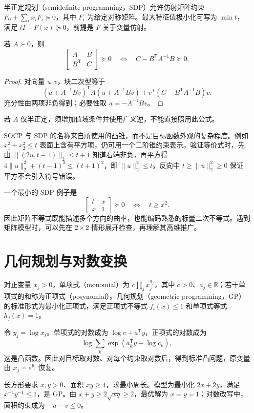 \documentclass[UTF8,12pt,a4paper,fontset=fandol]{ctexbook}
\begin{document}
半正定规划（semidefinite programming，SDP）允许仿射矩阵约束 $F_0+\sum_i x_iF_i\succeq0$，其中 $F_i$ 为给定对称矩阵。最大特征值极小化可写为 $\min t$，满足 $tI-F(x)\succeq0$，前提是 $F$ 关于变量仿射。

\begin{proposition}[Schur 补]
若 $A\succ0$，则
\[
 \begin{bmatrix}A&B\\B^{\mathsf T}&C\end{bmatrix}\succeq0
 \quad\Longleftrightarrow\quad C-B^{\mathsf T}A^{-1}B\succeq0.
\]
\end{proposition}
\begin{proof}
对向量 $u,v$，块二次型等于
\[
 (u+A^{-1}Bv)^{\mathsf T}A(u+A^{-1}Bv)
 +v^{\mathsf T}(C-B^{\mathsf T}A^{-1}B)v.
\]
充分性由两项非负得到；必要性取 $u=-A^{-1}Bv$。
\end{proof}
若 $A$ 仅半正定，须增加值域条件并使用广义逆，不能直接照用此公式。

SOCP 与 SDP 的名称来自所使用的凸锥，而不是目标函数外观的复杂程度。例如 $x_1^2+x_2^2\leq t$ 表面上含有平方项，仍可用一个二阶锥约束表示。验证等价式时，先由 $\|(2u,t-1)\|_2\leq t+1$ 知道右端非负，再平方得 $4\|u\|_2^2+(t-1)^2\leq(t+1)^2$，即 $\|u\|_2^2\leq t$。反向中 $t\geq\|u\|_2^2\geq0$ 保证平方不会引入符号错误。

一个最小的 SDP 例子是
\[
 \begin{bmatrix}t&x\\x&1\end{bmatrix}\succeq0
 \quad\Longleftrightarrow\quad t\geq x^2.
\]
因此矩阵不等式既能描述多个方向的曲率，也能编码熟悉的标量二次不等式。遇到矩阵模型时，可以先在 $2\times2$ 情形展开检查，再理解其高维推广。

\section{几何规划与对数变换}

对正变量 $x_j>0$，单项式（monomial）为 $c\prod_jx_j^{a_j}$，其中 $c>0$、$a_j\in\mathbb R$；若干单项式的和称为正项式（posynomial）。几何规划（geometric programming，GP）的标准形式为最小化正项式，满足正项式不等式 $f_i(x)\leq1$ 和单项式等式 $h_j(x)=1$。

令 $y_j=\log x_j$。单项式的对数成为 $\log c+a^{\mathsf T}y$，正项式的对数成为
\[
 \log\sum_k\exp(a_k^{\mathsf T}y+\log c_k),
\]
这是凸函数。因此对目标取对数、对每个约束取对数后，得到标准凸问题，原变量由 $x_j=e^{y_j}$ 恢复。

\begin{example}
长方形要求 $x,y>0$、面积 $xy\geq1$，求最小周长。模型为最小化 $2x+2y$，满足 $x^{-1}y^{-1}\leq1$，是 GP。由 $x+y\geq2\sqrt{xy}\geq2$，最优解为 $x=y=1$；对数改写中，面积约束成为 $-u-v\leq0$。
\end{example}
\end{document}
